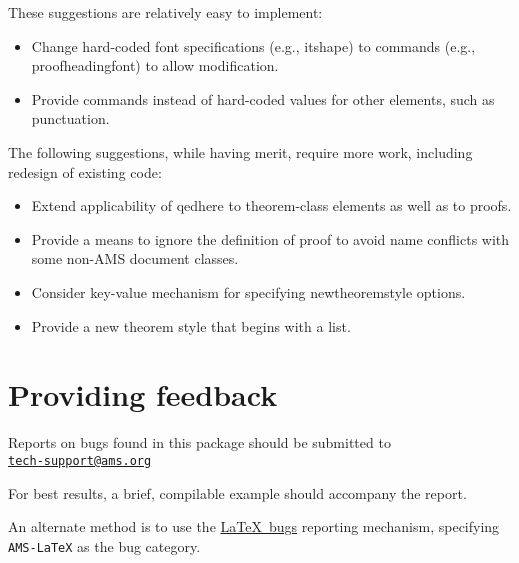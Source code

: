 \documentclass[11pt,twoside]{article}
\newcommand{\ntt}{%
  \fontfamily\ttdefault \fontseries\mddefault \fontshape\updefault
  \selectfont
}
\DeclareRobustCommand{\cn}[1]{{\ntt\bslchar#1}}
\DeclareRobustCommand{\env}[1]{{\ntt#1}}
\begin{document}
These suggestions are relatively easy to implement:

\begin{itemize}
\item Change hard-coded font specifications (e.g., \cn{itshape})
  to commands (e.g., \cn{proofheadingfont}) to allow modification.
\item Provide commands instead of hard-coded values for other elements,
  such as punctuation.
\end{itemize}

The following suggestions, while having merit, require more work, including
redesign of existing code:

\begin{itemize}
\item Extend applicability of \cn{qedhere} to theorem-class elements
  as well as to proofs.
\item Provide a means to ignore the definition of \env{proof} to
  avoid name conflicts with some non-AMS document classes.
\item Consider key-value mechanism for specifying \cn{newtheoremstyle}
  options.
\item Provide a new theorem style that begins with a list.
\end{itemize}


\section{Providing feedback}

Reports on bugs found in this package should be submitted to\\
 \null\hfil \href{mailto:tech-support@ams.org}{\texttt{tech-support@ams.org}}

\noindent
For best results, a brief, compilable example should accompany the report.

An alternate method is to use the
  \href{http://latex-project.org/bugs-upload.html}{\LaTeX\ bugs}
  reporting mechanism, specifying \texttt{AMS-LaTeX} as the bug category.

\end{document}
